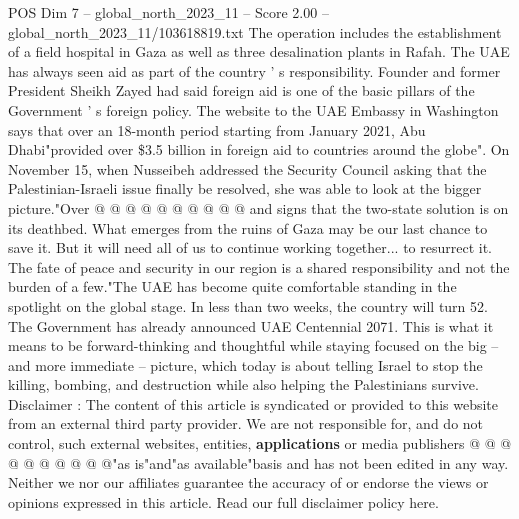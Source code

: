 \begin{textsample}{POS Dim 7 – global\_north\_2023\_11 – Score 2.00 – global\_north\_2023\_11/103618819.txt}
The operation includes the establishment of a field hospital in Gaza as well as three desalination plants in Rafah.
The UAE has always seen aid as part of the country ' s responsibility.
Founder and former President Sheikh Zayed had said foreign aid is one of the basic pillars of the Government ' s foreign policy.
The website to the UAE Embassy in Washington says that over an 18-month period starting from January 2021, Abu Dhabi"provided over \$3.5 billion in foreign aid to countries around the globe".
On November 15, when Nusseibeh addressed the Security Council asking that the Palestinian-Israeli issue finally be resolved, she was able to look at the bigger picture."Over @ @ @ @ @ @ @ @ @ @ and signs that the two-state solution is on its deathbed.
What emerges from the ruins of Gaza may be our last chance to save it.
But it will need all of us to continue working together... to resurrect it.
The fate of peace and security in our region is a shared responsibility and not the burden of a few."The UAE has become quite comfortable standing in the spotlight on the global stage.
In less than two weeks, the country will turn 52.
The Government has already announced UAE Centennial 2071.
This is what it means to be forward-thinking and thoughtful while staying focused on the big -- and more immediate -- picture, which today is about telling Israel to stop the killing, bombing, and destruction while also helping the Palestinians survive.
Disclaimer : The content of this article is syndicated or provided to this website from an external third party provider.
We are not responsible for, and do not control, such external websites, entities, \textbf{applications} or media publishers @ @ @ @ @ @ @ @ @ @"as is"and"as available"basis and has not been edited in any way.
Neither we nor our affiliates guarantee the accuracy of or endorse the views or opinions expressed in this article.
Read our full disclaimer policy here.

\end{textsample}
